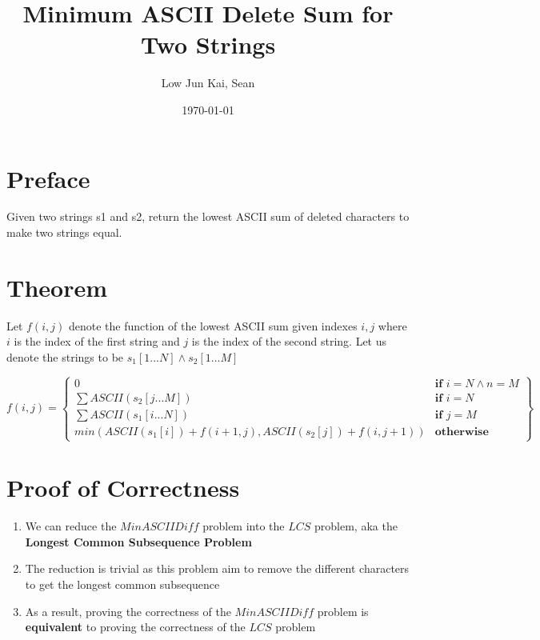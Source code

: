 \documentclass{article}
\title{Minimum ASCII Delete Sum for Two Strings}
\author{Low Jun Kai, Sean}
\date\today
\begin{document}
\maketitle %

\section*{Preface}

Given two strings s1 and s2, return the lowest ASCII sum of deleted characters to make two strings equal.

\section*{Theorem} 

Let $f(i, j)$ denote the function of the lowest ASCII sum given indexes $i, j$ where $i$ is the index of the first string and $j$ is the index of the second string. Let us denote the strings to be $s_1[1...N] \land s_2[1...M]$

\[
    f(i, j) =
    \left \{
    \begin{array}{ll}
      0 & \textbf{if } i = N \land n = M \\
      \sum ASCII(s_2[j...M]) & \textbf{if } i = N \\ 
      \sum ASCII(s_1[i...N]) & \textbf{if } j = M \\ 
	  min( ASCII(s_1[i]) + f(i+1, j),  ASCII(s_2[j]) + f(i, j+1) ) & \textbf{otherwise} 
    \end{array}
     \right \} 
\]

\section*{Proof of Correctness} 

\begin{enumerate}

\item We can reduce the $MinASCIIDiff$ problem into the $LCS$ problem, aka the \textbf{Longest Common Subsequence Problem} 

\item The reduction is trivial as this problem aim to remove the different characters to get the longest common subsequence 

\item As a result, proving the correctness of the $MinASCIIDiff$ problem is \textbf{equivalent} to proving the correctness of the $LCS$ problem

\end{enumerate}
\end{document}
